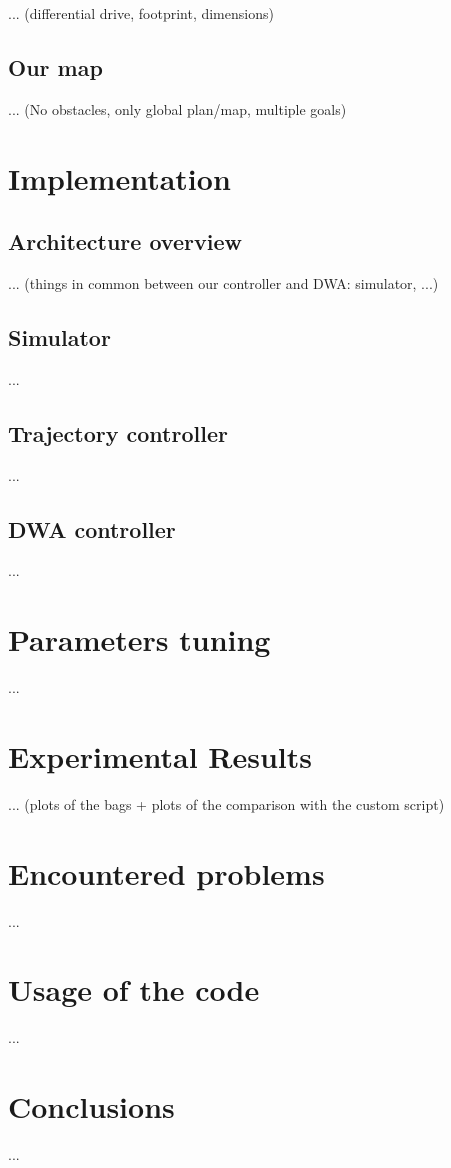 \documentclass[11pt,a4paper]{article}
\begin{document}
... (differential drive, footprint, dimensions)


\subsection{Our map}

... (No obstacles, only global plan/map, multiple goals)


\section{Implementation}
\label{sec:}

\subsection{Architecture overview}

... (things in common between our controller and DWA: simulator, ...)

\subsection{Simulator}

...

\subsection{Trajectory controller}

...

\subsection{DWA controller}

...


\section{Parameters tuning}
\label{sec:}

...


\section{Experimental Results}
\label{sec:}

... (plots of the bags + plots of the comparison with the custom script)


\section{Encountered problems}
\label{sec:}

...


\section{Usage of the code}
\label{sec:}

...


\section{Conclusions}
\label{sec:conclusions}

...

\end{document}

